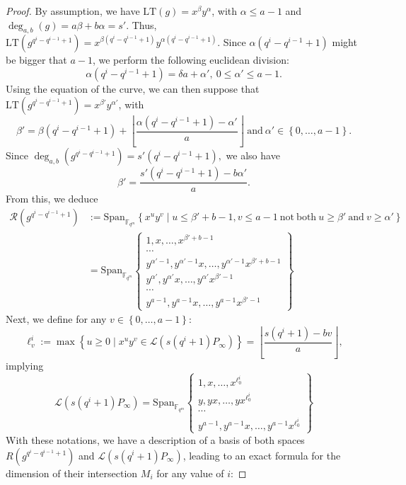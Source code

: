 \documentclass[a4paper]{article}
\theoremstyle{definition}
\theoremstyle{remark}
\newcommand{\calL}{\mathcal{L}}
\newcommand{\calR}{\mathcal{R}}
\newcommand{\fqm}{\mathbb{F}_{q^m}}
\newcommand{\set}[1]{\left\{#1\right\}}
\newcommand{\degab}[1]{\deg_{a,b}\left(#1\right)}
\begin{document}
\begin{proof}


By assumption, we have $\mathrm{LT}(g)=x^{\beta}y^{\alpha}$, with $\alpha \leq a-1$ and $\degab{g}=a\beta +b\alpha=s'$. 
Thus, $\mathrm{LT}(g^{q^i-q^{i-1}+1})=x^{\beta (q^i-q^{i-1}+1)}y^{\alpha (q^i-q^{i-1}+1)}$. Since $\alpha (q^i-q^{i-1}+1)$ might be bigger that $a-1$, we perform the following euclidean division:
$$\alpha (q^i-q^{i-1}+1) = \delta a + \alpha', \ 0 \leq \alpha' \leq a-1.$$
Using the equation of the curve, we can then suppose that $\mathrm{LT}(g^{q^i-q^{i-1}+1})=x^{\beta'}y^{\alpha '}$, with 
$$\beta' = \beta (q^i-q^{i-1}+1) + \left\lfloor \frac{\alpha (q^i-q^{i-1}+1)-\alpha'}{a} \right\rfloor \ \mathrm{and} \ \alpha' \in \set{0,\dots,a-1}.$$
Since $\degab{g^{q^i-q^{i-1}+1}} = s'(q^i-q^{i-1}+1),$ we also have 
\begin{equation} \label{eq:value_beta_prime}
\beta' = \dfrac{s'(q^i-q^{i-1}+1)-b\alpha'}{a}.
\end{equation}
From this, we deduce
\begin{align*}
\calR\left(g^{q^i-q^{i-1}+1}\right) &:= \mathrm{Span}_{\fqm} \left\{x^uy^v \mid u \leq \beta'+b-1 , v \leq a-1 \ \mathrm{not \ both} \ u \geq \beta' \ \mathrm{and} \ v \geq \alpha'\right\} \\
&= \mathrm{Span}_{\fqm}    \left\{ \begin{array}{cc}
         1,x,\dots,x^{\beta' +b-1}   \\
         \cdots \\
         y^{\alpha' -1},y^{\alpha' -1}x,\dots,y^{\alpha' -1}x^{\beta' +b-1} \\
          y^{\alpha'},y^{\alpha'}x,\dots,y^{\alpha'}x^{\beta'-1} \\
         \cdots \\
         y^{a-1},y^{a-1}x,\dots,y^{a-1}x^{\beta'-1}
    \end{array}
    \right\}
\end{align*}
Next, we define for any $v \in \set{0,\dots,a-1}$:
$$\ell^i_v := \max \set{u \geq 0 \mid x^uy^v \in \calL(s(q^i+1)P_\infty)} = \left\lfloor \dfrac{s(q^i+1)-bv}{a}\right\rfloor,$$
implying
\begin{equation*}
\calL(s(q^i+1)P_\infty) = \mathrm{Span}_{\fqm}    \left\{ \begin{array}{cc}
         1,x,\dots,x^{\ell^i_0}   \\
         y,yx,\dots,yx^{\ell^i_0} \\
         \cdots \\
         y^{a-1},y^{a-1}x,\dots,y^{a-1}x^{\ell^i_0}
    \end{array}
    \right\}
\end{equation*}
With these notations, we have a description of a basis of both spaces $R(g^{q^i-q^{i-1}+1})$ and $\calL(s(q^i+1)P_\infty)$, leading to an exact formula for the dimension of their intersection $M_i$ for any value of $i$:


\end{proof}
\end{document}
